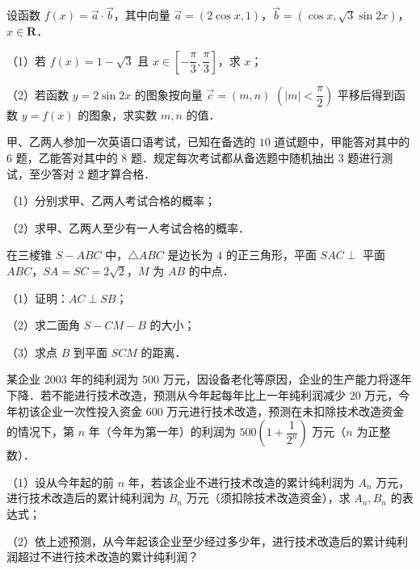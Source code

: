 \begin{question}
设函数 $f(x) = \vec{a} \cdot \vec{b}$，其中向量 $\vec{a} = (2\cos x, 1)$，$\vec{b} = (\cos x, \sqrt{3}\sin 2x)$，$x \in \mathbf{R}$．

（1）若 $f(x) = 1 - \sqrt{3}$ 且 $x \in \left[-\dfrac{\pi}{3}, \dfrac{\pi}{3}\right]$，求 $x$；

（2）若函数 $y = 2\sin 2x$ 的图象按向量 $\vec{c} = (m, n)$ $\left(|m| < \dfrac{\pi}{2}\right)$ 平移后得到函数 $y = f(x)$ 的图象，求实数 $m, n$ 的值．

\end{question}
\begin{question}
甲、乙两人参加一次英语口语考试，已知在备选的 $10$ 道试题中，甲能答对其中的 $6$ 题，乙能答对其中的 $8$ 题．规定每次考试都从备选题中随机抽出 $3$ 题进行测试，至少答对 $2$ 题才算合格．

（1）分别求甲、乙两人考试合格的概率；

（2）求甲、乙两人至少有一人考试合格的概率．

\Needspace{0.4\textheight}
\end{question}
\begin{question}
在三棱锥 $S - ABC$ 中，$\triangle ABC$ 是边长为 $4$ 的正三角形，平面 $SAC \perp$ 平面 $ABC$，$SA = SC = 2\sqrt{2}$，$M$ 为 $AB$ 的中点．

（1）证明：$AC \perp SB$；

（2）求二面角 $S - CM - B$ 的大小；

（3）求点 $B$ 到平面 $SCM$ 的距离．
\nopagebreak[4]
\begin{center}\end{center}
\nopagebreak[4]
\end{question}
\begin{question}
某企业 2003 年的纯利润为 $500$ 万元，因设备老化等原因，企业的生产能力将逐年下降．若不能进行技术改造，预测从今年起每年比上一年纯利润减少 $20$ 万元，今年初该企业一次性投入资金 $600$ 万元进行技术改造，预测在未扣除技术改造资金的情况下，第 $n$ 年（今年为第一年）的利润为 $500\left(1 + \dfrac{1}{2^n}\right)$ 万元（$n$ 为正整数）．

（1）设从今年起的前 $n$ 年，若该企业不进行技术改造的累计纯利润为 $A_n$ 万元，进行技术改造后的累计纯利润为 $B_n$ 万元（须扣除技术改造资金），求 $A_n, B_n$ 的表达式；

（2）依上述预测，从今年起该企业至少经过多少年，进行技术改造后的累计纯利润超过不进行技术改造的累计纯利润？

\Needspace{0.4\textheight}
\end{question}
